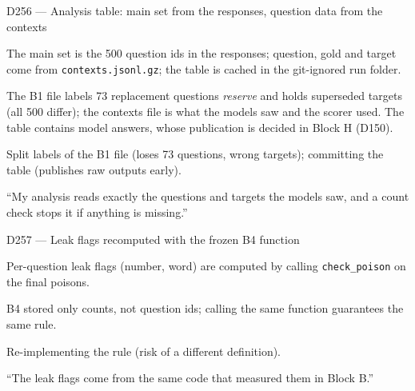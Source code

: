 \documentclass[11pt,a4paper]{report}
\begin{document}
\begin{decisionbox}{D256 --- Analysis table: main set from the responses, question data from the contexts}
\begin{description}[nosep, leftmargin=0pt]
  \item[Decision.] The main set is the 500 question ids in the responses; question, gold and target come from \texttt{contexts.jsonl.gz}; the table is cached in the git-ignored run folder.
  \item[Why.] The B1 file labels 73 replacement questions \emph{reserve} and holds superseded targets (all 500 differ); the contexts file is what the models saw and the scorer used. The table contains model answers, whose publication is decided in Block H (D150).
  \item[Alternatives.] Split labels of the B1 file (loses 73 questions, wrong targets); committing the table (publishes raw outputs early).
  \item[Interview line.] ``My analysis reads exactly the questions and targets the models saw, and a count check stops it if anything is missing.''
\end{description}
\end{decisionbox}

\begin{decisionbox}{D257 --- Leak flags recomputed with the frozen B4 function}
\begin{description}[nosep, leftmargin=0pt]
  \item[Decision.] Per-question leak flags (number, word) are computed by calling \texttt{check\_poison} on the final poisons.
  \item[Why.] B4 stored only counts, not question ids; calling the same function guarantees the same rule.
  \item[Alternatives.] Re-implementing the rule (risk of a different definition).
  \item[Interview line.] ``The leak flags come from the same code that measured them in Block B.''
\end{description}
\end{decisionbox}
\end{document}
